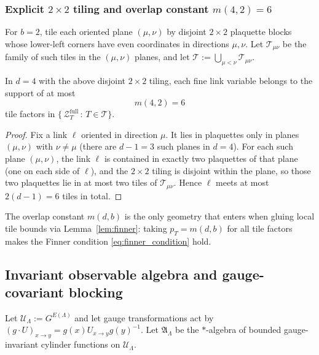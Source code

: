 \subsubsection{Explicit \texorpdfstring{$2\times 2$}{2x2} tiling and overlap constant \texorpdfstring{$m(4,2)=6$}{m(4,2)=6}}\label{sec:overlap_42}

For $b=2$, tile each oriented plane $(\mu,\nu)$ by disjoint $2\times 2$ plaquette blocks whose lower-left corners have even coordinates in directions $\mu,\nu$.
Let $\mathcal T_{\mu\nu}$ be the family of such tiles in the $(\mu,\nu)$ planes, and let $\mathcal T:=\bigcup_{\mu<\nu}\mathcal T_{\mu\nu}$.

\begin{lemma}[Overlap constant for the $2\times 2$ tiling in $d=4$]\label{lem:m42}
In $d=4$ with the above disjoint $2\times 2$ tiling, each fine link variable belongs to the support of at most
\[
m(4,2)=6
\]
tile factors in $\{\,\mathcal Z_T^{\mathrm{full}}\,:\,T\in\mathcal T\}$.
\end{lemma}

\begin{proof}
Fix a link $\ell$ oriented in direction $\mu$.
It lies in plaquettes only in planes $(\mu,\nu)$ with $\nu\neq \mu$ (there are $d-1=3$ such planes in $d=4$).
For each such plane $(\mu,\nu)$, the link $\ell$ is contained in exactly two plaquettes of that plane (one on each side of $\ell$), and the $2\times 2$ tiling is disjoint within the plane, so those two plaquettes lie in at most two tiles of $\mathcal T_{\mu\nu}$.
Hence $\ell$ meets at most $2(d-1)=6$ tiles in total.
\end{proof}

\begin{remark}
The overlap constant $m(d,b)$ is the only geometry that enters when gluing local tile bounds via Lemma~\ref{lem:finner}: taking $p_T=m(d,b)$ for all tile factors makes the Finner condition \eqref{eq:finner_condition} hold.
\end{remark}


\subsection{Invariant observable algebra and gauge-covariant blocking}\label{sec:inv}

Let $\mathcal U_\Lambda:=G^{E(\Lambda)}$ and let gauge transformations act by $(g\cdot U)_{x\to y}=g(x)U_{x\to y}g(y)^{-1}$.
Let $\mathfrak A_\Lambda$ be the $*$-algebra of bounded gauge-invariant cylinder functions on $\mathcal U_\Lambda$.

